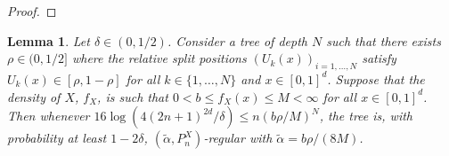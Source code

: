 \documentclass[paper=a4, fontsize=11pt]{scrartcl}
\newtheorem{lemma}[theorem]{Lemma}
\begin{document}
\begin{proof}

\end{proof}

\begin{lemma}\label{reci_wager_new}
Let $\delta \in (0, 1/2)$. Consider a tree of depth $N$ such that there exists $\rho \in (0, 1/2]$ where the relative split positions $(U_k(x))_{i=1,\dots,N}$ satisfy $U_k(x) \in [\rho, 1-\rho]$ for all $k \in \{1,\dots,N\}$ and $x\in [0,1]^d$. Suppose that the density of $X$, $f_X$, is such that $0 < b \leq f_X(x) \leq M < \infty$ for all $x \in [0,1]^d$. Then whenever $16\log( 4 (2n+1)^{2d} / \delta) \leq n (b\rho / M ) ^{N}$, the tree is, with probability at least $1-2\delta$, $(\tilde{\alpha},P_n^X)$-regular with $\tilde{\alpha} = {b\rho}/{(8M)}$.
\end{lemma}
\end{document}
